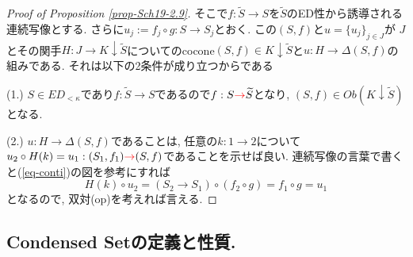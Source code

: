 \documentclass[dvipdfmx,a4paper,11pt]{article}
\theoremstyle{definition}
\newcommand{\xr}[1]{\textcolor{red}{#1}}
\begin{document}
\begin{proof}[Proof of Proposition \ref{prop-Sch19-2.9}]

そこで$f : \widetilde{S} \to S $を$\widetilde{S}$のED性から誘導される連続写像とする. 
さらに$u_j := f_j \circ g: S \to S_j$とおく. この$(S, f)$と$u=\{ u_j \}_{j \in J}$が
$J$とその関手$H : J \to K \downarrow \widetilde{S}$についてのcocone$(S,f) \in K \downarrow \widetilde{S}$と$u : H \to \Delta (S,f)$の組みである. 
それは以下の2条件が成り立つからである

(1.) $S \in ED_{<\kappa}$であり$f : \widetilde{S} \to S $であるので$f : S \xr{\to} \widetilde{S}$となり, $(S, f) \in Ob(K \downarrow \widetilde{S})$となる. 

(2.) $u : H \to \Delta (S,f)$であることは, 任意の$k : 1 \to 2$について
$u_{2} \circ H(k)  = u_{1} : (S_1,f_1) \xr{\to} (S,f)$であることを示せば良い.
連続写像の言葉で書くと(\ref{eq-conti})の図を参考にすれば
$$
H(k) \circ u_2
=
(S_2 \to S_1) \circ (f_2 \circ g)
=
f_1 \circ g 
=
u_1
$$
となるので, 双対(op)を考えれば言える.
\end{proof}

\subsection{Condensed Setの定義と性質.}
\end{document}
